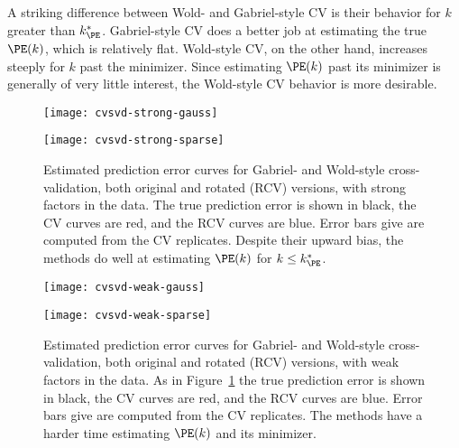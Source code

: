 A striking difference between Wold- and Gabriel-style CV is their behavior for $k$ greater than $k^\ast_{\PE}$.  Gabriel-style CV does a better job at estimating the true $\PE(k)$, which is relatively flat.  Wold-style CV, on the other hand, increases steeply for $k$ past the minimizer.  Since estimating $\PE(k)$ past its minimizer is generally of very little interest, the Wold-style CV behavior is more desirable.

\begin{figure}[ht]
    \centering
    \begin{minipage}{0.49\textwidth}
        \begin{center}
            \texttt{[image: cvsvd-strong-gauss]}
        \end{center}
    \end{minipage}
    \begin{minipage}{0.49\textwidth}
        \begin{center}
            \texttt{[image: cvsvd-strong-sparse]}
        \end{center}
    \end{minipage}
    \caption{
        Estimated prediction error curves for Gabriel- and Wold-style
        cross-validation, both original and rotated (RCV) versions, with
        strong factors in the data.  
        The true prediction error is shown in black, the CV curves are red, 
        and the RCV curves are blue.  Error bars give are computed from the 
        CV replicates.  Despite their upward bias, the methods do
        well at estimating $\PE(k)$ for $k \leq k^\ast_{\PE}$.
    }\label{F:cvsvd-pe-strong}
\end{figure}


\begin{figure}[ht]
    \centering
    \begin{minipage}{0.49\textwidth}
        \begin{center}
            \texttt{[image: cvsvd-weak-gauss]}
        \end{center}
    \end{minipage}
    \begin{minipage}{0.49\textwidth}
        \begin{center}
            \texttt{[image: cvsvd-weak-sparse]}
        \end{center}
    \end{minipage}
    \caption{
        Estimated prediction error curves for Gabriel- and Wold-style
        cross-validation, both original and rotated (RCV) versions, with
        weak factors in the data.  As in Figure~\ref{F:cvsvd-pe-strong} the
        true prediction error is shown in black, the CV curves are red, and
        the RCV curves are blue.  Error bars give are computed from the 
        CV replicates.  The methods have a harder time estimating $\PE(k)$
        and its minimizer.
    }\label{F:cvsvd-pe-weak}
\end{figure}

